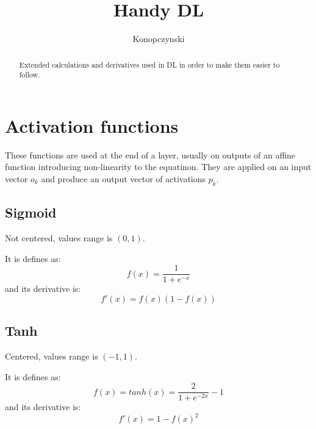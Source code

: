 \documentclass{article}
\begin{document}
\title{Handy DL}
\author{Konopczynski}

\maketitle






\begin{abstract}
Extended calculations and derivatives used in DL in order to make them easier to follow.
\end{abstract}




\section{Activation functions}
These functions are used at the end of a layer, usually on outputs of an affine function introducing non-linearity to the equatinon. They are applied on an input vector $o_k$ and produce an output vector of activations $p_k$.

\subsection{Sigmoid}
Not centered, values range is $(0,1)$.

It is defines as:
\begin{equation}
     \label{25}
f(x) = \frac{1}{1+e^{-x}}
\end{equation}
and its derivative is:
\begin{equation}
     \label{25}
f'(x) = f(x)(1-f(x))
\end{equation}

\subsection{Tanh}
Centered, values range is $(-1,1)$.

It is defines as:
\begin{equation}
     \label{25}
f(x) = tanh(x) = \frac{2}{1+e^{-2x}} -1
\end{equation}
and its derivative is:
\begin{equation}
     \label{25}
f'(x) = 1 - f(x)^2
\end{equation}
\end{document}
